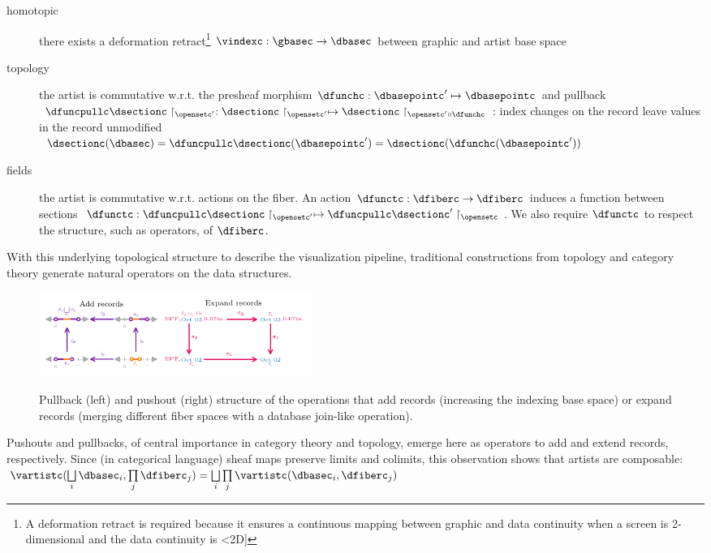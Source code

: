 \documentclass[preprint]{vgtc}
\begin{document}
\begin{description}
    \item[homotopic] there exists a deformation retract\footnote{A deformation retract is required because it ensures a continuous mapping between graphic and data continuity when a screen is 2-dimensional and the data continuity is <2D]} $\vindexc: \gbasec\rightarrow\dbasec$ between graphic and artist base space
    \item[topology] the artist is commutative w.r.t. the presheaf morphism $\dfunchc: \dbasepointc^{\prime}\mapsto \dbasepointc$ and pullback $\dfuncpullc \dsectionc \restriction_{\opensetc^{\prime}}: \dsectionc\restriction_{\opensetc^{\prime}} \mapsto \dsectionc \restriction_{\opensetc^{\prime} \circ \dfunchc}$: index changes on the record leave values in the record unmodified
    $\dsectionc(\dbasec) = \dfuncpullc\dsectionc(\dbasepointc^{\prime}) = \dsectionc(\dfunchc(\dbasepointc^{\prime}))$
    \item[fields] the artist is commutative w.r.t. actions on the fiber. An action $\dfunctc: \dfiberc\to\dfiberc$ induces a function between sections $\dfunctc: \dfuncpullc \dsectionc \restriction_{\opensetc^{\prime}} \mapsto \dfuncpullc \dsectionc^{\prime} \restriction_{\opensetc}$. We also require $\dfunctc$ to respect the structure, such as operators, of $\dfiberc$.
\end{description}

With this underlying topological structure to describe the visualization pipeline, traditional constructions from topology and category theory generate natural operators on the data structures.
\begin{figure}[!h]
\includegraphics[width=3.5in, alt={Records are added by taking the union of base spaces. Fields are added by taking the cartesian product of fiber spaces.}]{more_records.pdf}
\caption{Pullback (left) and pushout (right) structure of the operations that add records (increasing the indexing base space) or expand records (merging different fiber spaces with a database join-like operation).}\label{fig:more-records}
\end{figure}

Pushouts and pullbacks, of central importance in category theory and topology, emerge here as operators to add and extend records, respectively. Since (in categorical language) sheaf maps preserve limits and colimits, this observation shows that artists are composable: $\vartistc(\bigsqcup\limits_{i}\dbasec_i, \prod\limits_j\dfiberc_j) = \bigsqcup\limits_i\prod\limits_j\vartistc(\dbasec_i, \dfiberc_j)$
\end{document}
